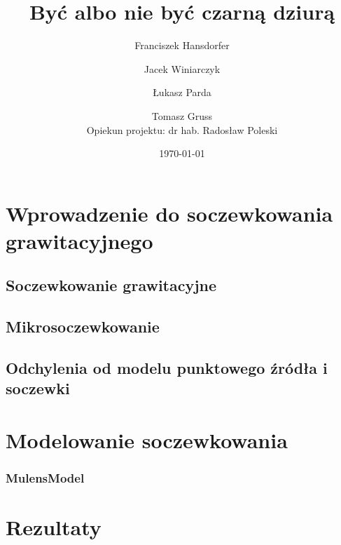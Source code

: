 \documentclass{beamer}
\title{Być albo nie być czarną dziurą}
\author[F. Hansdorfer \and J. Winiarczyk \and Ł. Parda
\and T. Gruss]{Franciszek Hansdorfer \and Jacek Winiarczyk \and Łukasz Parda
\and Tomasz Gruss\\{\small Opiekun projektu: dr hab. Radosław Poleski}}
\date{\today}
\begin{document}
\begin{frame}
    \titlepage
\end{frame}

\section{Wprowadzenie do soczewkowania grawitacyjnego}

\subsection{Soczewkowanie grawitacyjne}


\subsection{Mikrosoczewkowanie}
\begin{frame}



\end{frame}


\subsection{Odchylenia od modelu punktowego źródła i soczewki}

\section{Modelowanie soczewkowania}
\subsubsection{MulensModel}

\section{Rezultaty}
\end{document}
